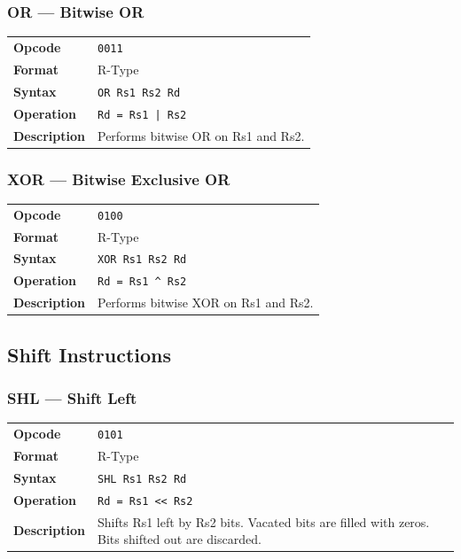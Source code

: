 \documentclass[11pt,a4paper]{article}
\newcommand{\opcode}[1]{\texttt{#1}}
\begin{document}
\subsubsection{OR --- Bitwise OR}

\begin{table}[H]
\begin{tabularx}{\textwidth}{@{}lX@{}}
\toprule
\textbf{Opcode}      & \opcode{0011} \\
\textbf{Format}      & R-Type \\
\textbf{Syntax}      & \lstinline|OR Rs1 Rs2 Rd| \\
\textbf{Operation}   & \texttt{Rd = Rs1 | Rs2} \\
\textbf{Description} & Performs bitwise OR on Rs1 and Rs2. \\
\bottomrule
\end{tabularx}
\end{table}

\subsubsection{XOR --- Bitwise Exclusive OR}

\begin{table}[H]
\begin{tabularx}{\textwidth}{@{}lX@{}}
\toprule
\textbf{Opcode}      & \opcode{0100} \\
\textbf{Format}      & R-Type \\
\textbf{Syntax}      & \lstinline|XOR Rs1 Rs2 Rd| \\
\textbf{Operation}   & \texttt{Rd = Rs1 \^{} Rs2} \\
\textbf{Description} & Performs bitwise XOR on Rs1 and Rs2. \\
\bottomrule
\end{tabularx}
\end{table}

\subsection{Shift Instructions}

\subsubsection{SHL --- Shift Left}

\begin{table}[H]
\begin{tabularx}{\textwidth}{@{}lX@{}}
\toprule
\textbf{Opcode}      & \opcode{0101} \\
\textbf{Format}      & R-Type \\
\textbf{Syntax}      & \lstinline|SHL Rs1 Rs2 Rd| \\
\textbf{Operation}   & \texttt{Rd = Rs1 <{}< Rs2} \\
\textbf{Description} & Shifts Rs1 left by Rs2 bits. Vacated bits are filled with zeros. Bits shifted out are discarded. \\
\bottomrule
\end{tabularx}
\end{table}
\end{document}
